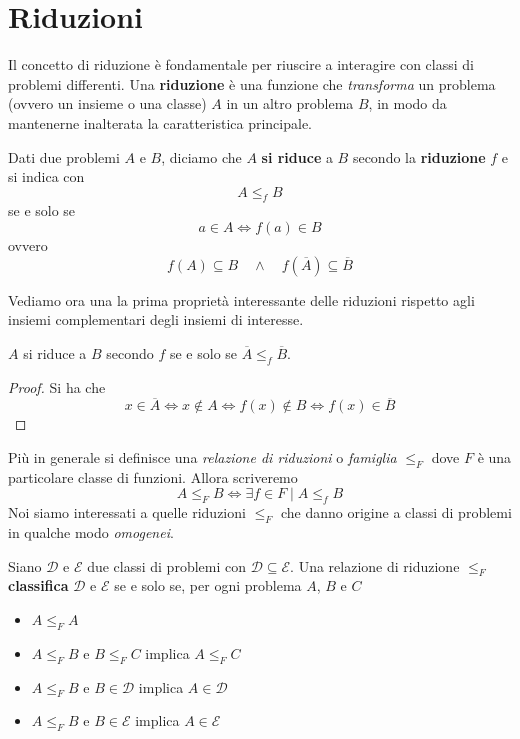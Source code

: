 \section{Riduzioni}
Il concetto di riduzione è fondamentale per riuscire a interagire
con classi di problemi differenti. Una \textbf{riduzione} è una
funzione che \emph{transforma} un problema (ovvero un insieme o
una classe) $A$ in un altro problema $B$, in modo da mantenerne
inalterata la caratteristica principale.

\begin{definition} \label{def: riduzione}
	Dati due problemi $A$ e $B$, diciamo che $A$ \textbf{si riduce}
	a $B$ secondo la \textbf{riduzione} $f$ e si indica con
	\[ A \leq_f B \]
	se e solo se
	\[ a \in A \iff f(a) \in B \]
	ovvero
	\[
		f(A) \subseteq B \quad \land
		\quad f(\overline{A}) \subseteq \overline{B}
	\]
\end{definition}

Vediamo ora una la prima proprietà interessante delle riduzioni
rispetto agli insiemi complementari degli insiemi di interesse.

\begin{property} \label{prop: riduzione_comp}
	$A$ si riduce a $B$ secondo $f$ se e solo se
	$\overline{A} \leq_f \overline{B}$.
	\begin{proof}
		Si ha che
		\[
			x \in \overline{A} \iff x \notin A \iff
			f(x) \notin B \iff f(x) \in \overline{B}
		\]
	\end{proof}
\end{property}

Più in generale si definisce una \emph{relazione di riduzioni}
o \emph{famiglia} $\leq_F$ dove $F$ è una particolare classe di
funzioni. Allora scriveremo
\[ A \leq_F B \iff \exists f \in F \mid A \leq_f B \]
Noi siamo interessati a quelle riduzioni $\leq_F$ che danno
origine a classi di problemi in qualche modo \emph{omogenei}.

\begin{lemma} \label{def: classificazione}
	Siano $\mathcal{D}$ e $\mathcal{E}$ due classi di problemi
	con $\mathcal{D} \subseteq \mathcal{E}$. Una relazione di
	riduzione $\leq_F$ \textbf{classifica} $\mathcal{D}$ e
	$\mathcal{E}$ se e solo se, per ogni problema $A$, $B$ e $C$
	\begin{itemize}
		\item $A \leq_F A$
		\item $A \leq_F B$ e $B \leq_F C$ implica $A \leq_F C$
		\item $A \leq_F B$ e $B \in \mathcal{D}$ implica
		      $A \in \mathcal{D}$
		\item $A \leq_F B$ e $B \in \mathcal{E}$ implica
		      $A \in \mathcal{E}$
	\end{itemize}
\end{lemma}

